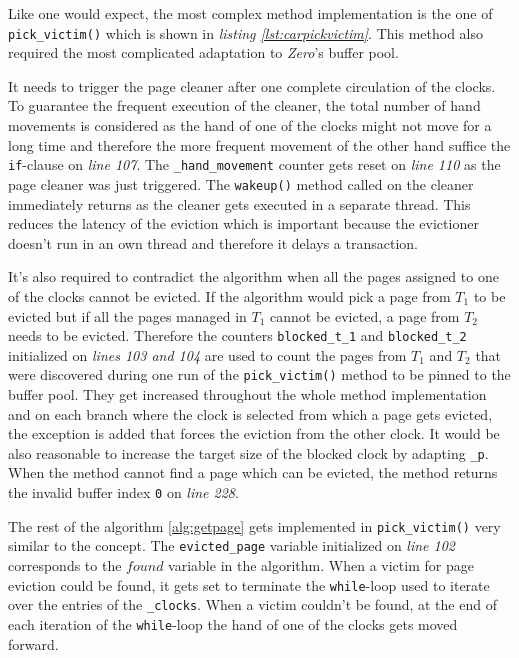 	Like one would expect, the most complex method implementation is the one of \lstinline{pick_victim()} which is shown in \emph{listing \ref{lst:carpickvictim}}. This method also required the most complicated adaptation to \emph{Zero}'s buffer pool.
	
	It needs to trigger the page cleaner after one complete circulation of the clocks. To guarantee the frequent execution of the cleaner, the total number of hand movements is considered as the hand of one of the clocks might not move for a long time and therefore the more frequent movement of the other hand suffice the \lstinline{if}-clause on \emph{line 107}. The \lstinline{_hand_movement} counter gets reset on \emph{line 110} as the page cleaner was just triggered. The \lstinline{wakeup()} method called on the cleaner immediately returns as the cleaner gets executed in a separate thread. This reduces the latency of the eviction which is important because the evictioner doesn't run in an own thread and therefore it delays a transaction.
	
	It's also required to contradict the algorithm when all the pages assigned to one of the clocks cannot be evicted. If the algorithm would pick a page from $T_1$  to be evicted but if all the pages managed in $T_1$ cannot be evicted, a page from $T_2$ needs to be evicted. Therefore the counters \lstinline{blocked_t_1} and \lstinline{blocked_t_2} initialized on \emph{lines 103 and 104} are used to count the pages from $T_1$ and $T_2$ that were discovered during one run of the \lstinline{pick_victim()} method to be pinned to the buffer pool. They get increased throughout the whole method implementation and on each branch where the clock is selected from which a page gets evicted, the exception is added that forces the eviction from the other clock. It would be also reasonable to increase the target size of the blocked clock by adapting \lstinline{_p}. When the method cannot find a page which can be evicted, the method returns the invalid buffer index \lstinline{0} on \emph{line 228}.
	
	The rest of the algorithm \ref{alg:getpage} gets implemented in \lstinline{pick_victim()} very similar to the concept. The \lstinline{evicted_page} variable initialized on \emph{line 102} corresponds to the $found$ variable in the algorithm. When a victim for page eviction could be found, it gets set to terminate the \lstinline{while}-loop used to iterate over the entries of the \lstinline{_clocks}. When a  victim couldn't be found, at the end of each iteration of the \lstinline{while}-loop the hand of one of the clocks gets moved forward.
	
